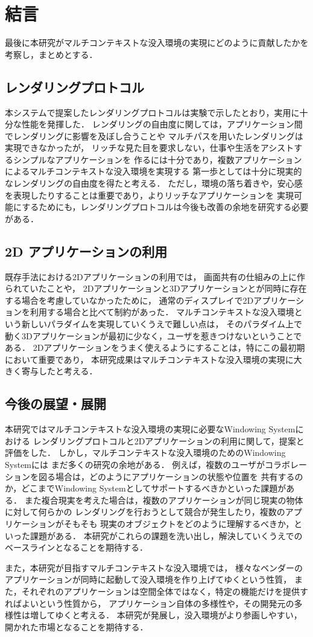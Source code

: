 \chapter{結言}


最後に本研究がマルチコンテキストな没入環境の実現にどのように貢献したかを考察し，まとめとする．

\section{レンダリングプロトコル}

本システムで提案したレンダリングプロトコルは実験で示したとおり，実用に十分な性能を発揮した．
レンダリングの自由度に関しては，アプリケーション間でレンダリングに影響を及ぼし合うことや
マルチパスを用いたレンダリングは実現できなかったが，
リッチな見た目を要求しない，仕事や生活をアシストするシンプルなアプリケーションを
作るには十分であり，複数アプリケーションによるマルチコンテキストな没入環境を実現する
第一歩としては十分に現実的なレンダリングの自由度を得たと考える．
ただし，環境の落ち着きや，安心感を表現したりすることは重要であり，よりリッチなアプリケーションを
実現可能にするためにも，レンダリングプロトコルは今後も改善の余地を研究する必要がある．

\section{2D アプリケーションの利用}

既存手法における2Dアプリケーションの利用では，
画面共有の仕組みの上に作られていたことや，
2Dアプリケーションと3Dアプリケーションとが同時に存在する場合を考慮していなかったために，
通常のディスプレイで2Dアプリケーションを利用する場合と比べて制約があった．
マルチコンテキストな没入環境という新しいパラダイムを実現していくうえで難しい点は，
そのパラダイム上で動く3Dアプリケーションが最初に少なく，ユーザを惹きつけないということである．
2Dアプリケーションをうまく使えるようにすることは，特にこの最初期において重要であり，
本研究成果はマルチコンテキストな没入環境の実現に大きく寄与したと考える．

\section{今後の展望・展開}

本研究ではマルチコンテキストな没入環境の実現に必要なWindowing Systemにおける
レンダリングプロトコルと2Dアプリケーションの利用に関して，提案と評価をした．
しかし，マルチコンテキストな没入環境のためのWindowing Systemには
まだ多くの研究の余地がある．
例えば，複数のユーザがコラボレーションを図る場合は，どのようにアプリケーションの状態や位置を
共有するのか，どこまでWindowing Systemとしてサポートするべきかといった課題がある．
また複合現実を考えた場合は，複数のアプリケーションが同じ現実の物体に対して何らかの
レンダリングを行おうとして競合が発生したり，複数のアプリケーションがそもそも
現実のオブジェクトをどのように理解するべきか，といった課題がある．
本研究がこれらの課題を洗い出し，解決していくうえでのベースラインとなることを期待する．

また，本研究が目指すマルチコンテキストな没入環境では，
様々なベンダーのアプリケーションが同時に起動して没入環境を作り上げてゆくという性質，
また，それぞれのアプリケーションは空間全体ではなく，特定の機能だけを提供すればよいという性質から，
アプリケーション自体の多様性や，その開発元の多様性は増してゆくと考える．
本研究が発展し，没入環境がより参画しやすい，開かれた市場となることを期待する．
